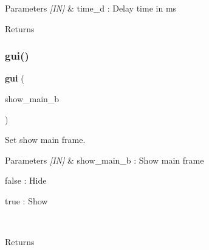 \begin{DoxyCode}{0}
\DoxyCodeLine{\textcolor{comment}{// Delay 1s}}
\end{DoxyCode}



\begin{DoxyParams}{Parameters}
{\em \mbox{[}\+I\+N\mbox{]}} & time\+\_\+d \+: Delay time in ms \\
\hline
\end{DoxyParams}
\begin{DoxyReturn}{Returns}

\end{DoxyReturn}
\mbox{\label{group___public__function_gadabcc326659f50e5a97ed53d77746e73}} 
\subsubsection{gui()\hspace{0.1cm}{\footnotesize\ttfamily [1/3]}}
{\footnotesize\ttfamily \textbf{ gui} (\begin{DoxyParamCaption}\item[{show\+\_\+main\+\_\+b}]{ }\end{DoxyParamCaption})}



Set show main frame. 


\begin{DoxyCode}{0}
\end{DoxyCode}



\begin{DoxyParams}{Parameters}
{\em \mbox{[}\+I\+N\mbox{]}} & show\+\_\+main\+\_\+b \+: Show main frame \begin{DoxyItemize}
\item false \+: Hide \item true \+: Show \end{DoxyItemize}
\\
\hline
\end{DoxyParams}
\begin{DoxyReturn}{Returns}

\end{DoxyReturn}
\mbox{\label{group___public__function_ga7460524f7b40c35964f7d07689aab888}} 
